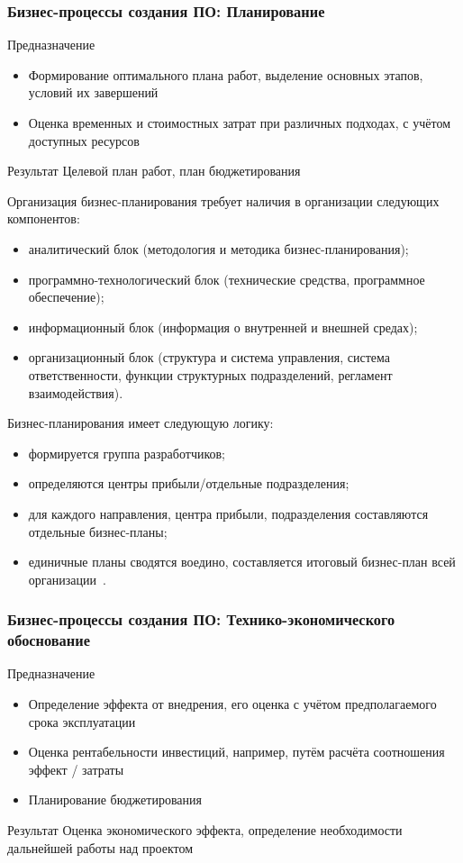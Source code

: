 \documentclass{../industrial-development}
\begin{document}
\begin{frame} \frametitle{Бизнес-процессы создания ПО: Планирование}
	\begin{block}{Предназначение}
		\begin{itemize}
			\item Формирование оптимального плана работ, выделение основных этапов, условий их завершений
			\item Оценка временных и стоимостных затрат при различных подходах, с учётом доступных ресурсов
		\end{itemize}
	\end{block}
	\begin{block}{Результат}
		Целевой план работ, план бюджетирования
	\end{block}
\end{frame}

\lecturenotes

Организация бизнес-планирования требует наличия в организации следующих компонентов:
\begin{itemize}
	\item аналитический блок (методология и методика бизнес-планирования);
	\item программно-технологический блок (технические средства, программное обеспечение);
	\item информационный блок (информация о внутренней и внешней средах);
	\item организационный блок (структура и система управления, система ответственности, функции структурных подразделений, регламент взаимодействия).
\end{itemize}

Бизнес-планирования имеет следующую логику:
\begin{itemize}
	\item формируется группа разработчиков;
	\item определяются центры прибыли/отдельные подразделения;
	\item для каждого направления, центра прибыли, подразделения составляются отдельные бизнес-планы;
	\item единичные планы сводятся воедино, составляется итоговый бизнес-план всей организации~\cite{Centeryf}.
\end{itemize}


\begin{frame} \frametitle{Бизнес-процессы создания ПО: Технико-экономического обоснование}
	\begin{block}{Предназначение}
		\begin{itemize}
			\item Определение эффекта от внедрения, его оценка с учётом предполагаемого срока эксплуатации
			\item Оценка рентабельности инвестиций, например, путём расчёта соотношения эффект / затраты
			\item Планирование бюджетирования
		\end{itemize}
	\end{block}
	\begin{block}{Результат}
		Оценка экономического эффекта, определение необходимости дальнейшей работы над проектом
	\end{block}
\end{frame}
\end{document}
